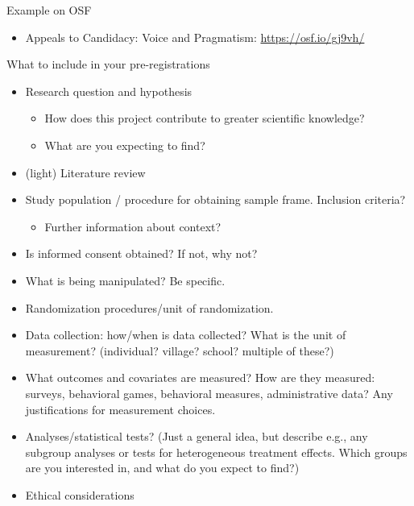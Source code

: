 \documentclass[xcolor={dvipsnames},handout]{beamer}
\begin{document}
\begin{frame}{Example on OSF}

\begin{itemize}
\item Appeals to Candidacy: Voice and Pragmatism: \url{https://osf.io/gj9vh/}
\end{itemize}

\end{frame}



\begin{frame}{What to include in your pre-registrations}
\scriptsize
\begin{itemize}
\item Research question and hypothesis
\begin{itemize}\scriptsize
\item How does this project contribute to greater scientific knowledge?
\item What are you expecting to find?
\end{itemize}
\item (light) Literature review 
\item Study population / procedure for obtaining sample frame. Inclusion criteria?
\begin{itemize}\scriptsize
\item Further information about context?
\end{itemize}
\item Is informed consent obtained? If not, why not?
\item What is being manipulated? Be specific. 
\item Randomization procedures/unit of randomization. 
\item Data collection: how/when is data collected? What is the unit of measurement? (individual? village? school? multiple of these?)
\item What outcomes and covariates are measured? How are they measured: surveys, behavioral games, behavioral measures, administrative data? Any justifications for measurement choices. 
\item Analyses/statistical tests? (Just a general idea, but describe e.g., any subgroup analyses or tests for heterogeneous treatment effects. Which groups are you interested in, and what do you expect to find?)
\item Ethical considerations
\end{itemize}

\end{frame}
\end{document}
